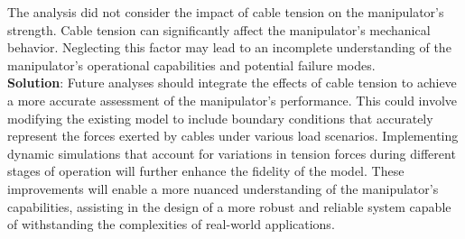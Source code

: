 \begin{itemize}
    The analysis did not consider the impact of cable tension on the manipulator's strength. Cable tension 
    can significantly affect the manipulator's mechanical behavior. Neglecting this factor may lead to an 
    incomplete understanding of the manipulator's operational capabilities and potential failure modes. \\
    \textbf{Solution}: Future analyses should integrate the effects of cable tension to achieve a more accurate 
    assessment of the manipulator's performance. This could involve modifying the existing model to include 
    boundary conditions that accurately represent the forces exerted by cables under various load scenarios. 
    Implementing dynamic simulations that account for variations in tension forces during different stages of 
    operation will further enhance the fidelity of the model. These improvements will enable a more nuanced 
    understanding of the manipulator's capabilities, assisting in the design of a more robust and reliable 
    system capable of withstanding the complexities of real-world applications. 
\end{itemize}
